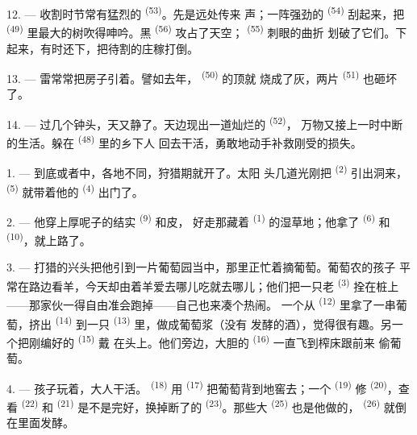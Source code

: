 12. --- 收割时节常有猛烈的 \textsuperscript{(53)}。先是远处传来
声；一阵强劲的 \textsuperscript{(54)} 刮起来，把
 \textsuperscript{(49)} 里最大的树吹得呻吟。黑
\textsuperscript{(56)} 攻占了天空； \textsuperscript{(55)} 刺眼的曲折
划破了它们。下起来，有时还下，把待割的庄稼打倒。

13. --- 雷常常把房子引着。譬如去年， \textsuperscript{(50)} 的顶就
烧成了灰，两片 \textsuperscript{(51)} 也砸坏了。

14. --- 过几个钟头，天又静了。天边现出一道灿烂的 \textsuperscript{(52)}，
万物又接上一时中断的生活。躲在 \textsuperscript{(48)} 里的乡下人
回去干活，勇敢地动手补救刚受的损失。

\VUsaut{6.0mm}
\VUsaut{3.6mm}

\VUsaut{1.4mm}
\VUsaut{4.0mm}

1. --- 到底或者中，各地不同，狩猎期就开了。太阳
头几道光刚把 \textsuperscript{(2)} 引出洞来，
\textsuperscript{(5)} 就带着他的 \textsuperscript{(4)} 出门了。

2. --- 他穿上厚呢子的结实 \textsuperscript{(9)} 和皮，
好走那藏着 \textsuperscript{(1)} 的湿草地；他拿了
\textsuperscript{(6)} 和 \textsuperscript{(10)}，就上路了。

3. --- 打猎的兴头把他引到一片葡萄园当中，那里正忙着摘葡萄。葡萄农的孩子
平常在路边看羊，今天却由着羊爱去哪儿吃就去哪儿；他们把一只老
\textsuperscript{(3)} 拴在桩上——那家伙一得自由准会跑掉——自己也来凑个热闹。
一个从 \textsuperscript{(12)} 里拿了一串葡萄，挤出
\textsuperscript{(14)} 到一只 \textsuperscript{(13)} 里，做成葡萄浆（没有
发酵的酒），觉得很有趣。另一个把刚编好的 \textsuperscript{(15)} 戴
在头上。他们旁边，大胆的 \textsuperscript{(16)} 一直飞到榨床跟前来
偷葡萄。

4. --- 孩子玩着，大人干活。 \textsuperscript{(18)} 用
 \textsuperscript{(17)} 把葡萄背到地窖去；一个
\textsuperscript{(19)} 修 \textsuperscript{(20)}，查看
\textsuperscript{(22)} 和 \textsuperscript{(21)} 是不是完好，换掉断了的
 \textsuperscript{(23)}。那些大 \textsuperscript{(25)} 也是他做的，
 \textsuperscript{(26)} 就倒在里面发酵。


